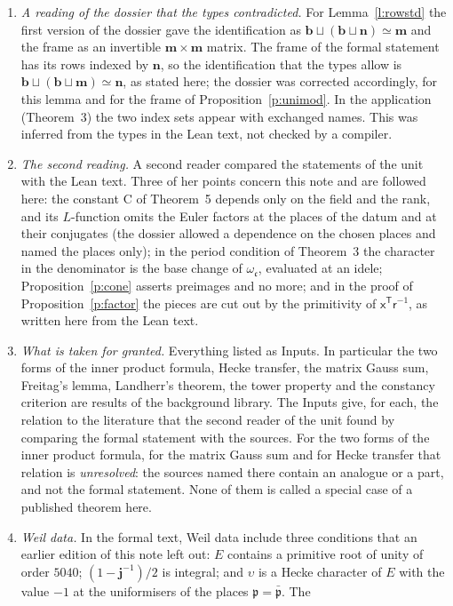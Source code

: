 \documentclass[11pt,a4paper]{article}
\theoremstyle{plainx}
\theoremstyle{uprightx}
\newcommand{\bb}{\mathbf{b}}
\newcommand{\bm}{\mathbf{m}}
\newcommand{\bn}{\mathbf{n}}
\newcommand{\sx}{\mathsf{x}}
\newcommand{\fc}{\mathfrak{c}}
\newcommand{\fp}{\mathfrak{p}}
\newcommand{\rC}{\mathrm{C}}
\begin{document}
\begin{enumerate}[label=\textup{\arabic*.},leftmargin=1.6em,itemsep=5pt]
as taken only if the defining term uses them.
\item \emph{A reading of the dossier that the types contradicted.} For Lemma~\ref{l:rowstd} the first version of
the dossier gave the identification as $\bb\sqcup(\bb\sqcup\bn)\simeq\bm$ and the frame as an invertible
$\bm\times\bm$ matrix. The frame of the formal statement has its rows indexed by $\bn$, so the identification that
the types allow is $\bb\sqcup(\bb\sqcup\bm)\simeq\bn$, as stated here; the dossier was corrected accordingly, for
this lemma and for the frame of Proposition~\ref{p:unimod}. In the application (Theorem~3) the two index sets
appear with exchanged names. This was inferred from the types in the Lean text, not checked by a compiler.
\item \emph{The second reading.} A second reader compared the statements of the unit with the Lean text. Three
of her points concern this note and are followed here: the constant $\rC$ of Theorem~5 depends only on the field
and the rank, and its $L$-function omits the Euler factors at the places of the datum and at their conjugates
(the dossier allowed a dependence on the chosen places and named the places only); in the period condition of
Theorem~3 the character in the denominator is the base change of $\omega_{\fc}$, evaluated at an idele;
Proposition~\ref{p:cone} asserts preimages and no more; and in the proof of Proposition~\ref{p:factor} the pieces
are cut out by the primitivity of $\sx^{\mathsf T}\mathsf{r}^{-1}$, as written here from the Lean text.
\item \emph{What is taken for granted.} Everything listed as Inputs. In particular the two forms of the inner
product formula, Hecke transfer, the matrix Gauss sum, Freitag's lemma, Landherr's theorem, the tower property and
the constancy criterion are results of the background library. The Inputs give, for each, the relation to the
literature that the second reader of the unit found by comparing the formal statement with the sources. For the
two forms of the inner product formula, for the matrix Gauss sum and for Hecke transfer that relation is
\emph{unresolved}: the sources named there contain an analogue or a part, and not the formal statement. None of
them is called a special case of a published theorem here.
\item \emph{Weil data.} In the formal text, Weil data include three conditions that an earlier edition of this
note left out: $E$ contains a primitive root of unity of order $5040$; $(1-\mathbf{j}^{-1})/2$ is integral; and
$\upsilon$ is a Hecke character of $E$ with the value $-1$ at the uniformisers of the places $\fp=\bar{\fp}$. The

\end{enumerate}
\end{document}
